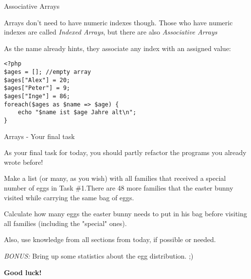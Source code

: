 \begin{frame}[fragile]{Associative Arrays}

Arrays don't need to have numeric indexes though. Those who have numeric indexes are called \emph{Indexed Arrays}, but there are also \emph{Associative Arrays}\pause

As the name already hints, they associate any index with an assigned value:
\begin{lstlisting}
<?php
$ages = []; //empty array
$ages["Alex"] = 20;
$ages["Peter"] = 9;
$ages["Inge"] = 86;
foreach($ages as $name => $age) {
    echo "$name ist $age Jahre alt\n";
}
\end{lstlisting} \pause

\end{frame}

\begin{frame}[fragile]{Arrays - Your final task}

As your final task for today, you should partly refactor the programs you already wrote before! \pause

Make a list (or many, as you wish) with all families that received a special number of eggs in Task \#{}1.\pause There are 48 more families that the easter bunny visited while carrying the same bag of eggs. \pause

Calculate how many eggs the easter bunny needs to put in his bag before visiting all families (including the "special" ones). \pause

Also, use knowledge from all sections from today, if possible or needed. \pause

\emph{BONUS:} Bring up some statistics about the egg distribution. ;)

\textbf{Good luck!}

\end{frame}




